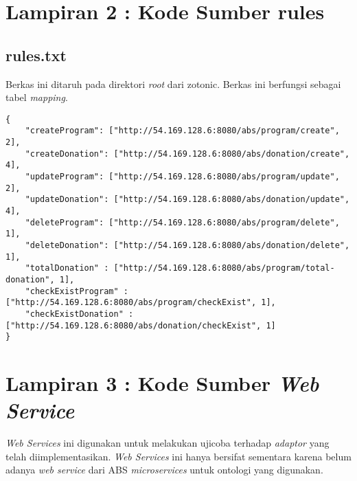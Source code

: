 \chapter*{Lampiran 2 : Kode Sumber rules}
\section*{rules.txt}
Berkas ini ditaruh pada direktori \textit{root} dari zotonic. Berkas ini berfungsi sebagai tabel \textit{mapping}.
\begin{lstlisting}[caption={Berkas rules.txt},label={lst:excomp}]
{
	"createProgram": ["http://54.169.128.6:8080/abs/program/create", 2],
	"createDonation": ["http://54.169.128.6:8080/abs/donation/create", 4],
	"updateProgram": ["http://54.169.128.6:8080/abs/program/update", 2],
	"updateDonation": ["http://54.169.128.6:8080/abs/donation/update", 4],
	"deleteProgram": ["http://54.169.128.6:8080/abs/program/delete", 1],
	"deleteDonation": ["http://54.169.128.6:8080/abs/donation/delete", 1],
	"totalDonation" : ["http://54.169.128.6:8080/abs/program/total-donation", 1],
	"checkExistProgram" : ["http://54.169.128.6:8080/abs/program/checkExist", 1],
	"checkExistDonation" : ["http://54.169.128.6:8080/abs/donation/checkExist", 1]
}
\end{lstlisting}

\chapter*{Lampiran 3 : Kode Sumber \textit{Web Service}}
\textit{Web Services} ini digunakan untuk melakukan ujicoba terhadap \textit{adaptor} yang telah diimplementasikan. \textit{Web Services} ini hanya bersifat sementara karena belum adanya \textit{web service} dari ABS \textit{microservices} untuk ontologi yang digunakan.
